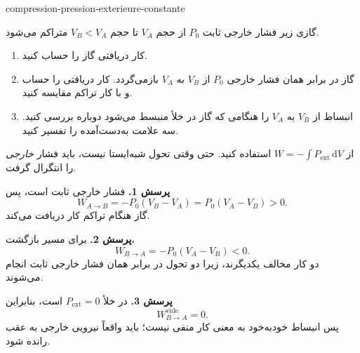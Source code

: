 \begin{exo}{compression-pression-exterieure-constante}

گازی زیر فشار خارجی ثابت $P_0$ از حجم $V_A$ تا حجم $V_B<V_A$ متراکم می‌شود.

\begin{enumerate}
\item کار دریافتی گاز را حساب کنید.
\item گاز در برابر همان فشار خارجی $P_0$ از $V_B$ به $V_A$ بازمی‌گردد. کار دریافتی را حساب و با کار تراکم مقایسه کنید.
\item انبساط از $V_B$ به $V_A$ را هنگامی که گاز در خلأ منبسط می‌شود دوباره بررسی کنید. سه علامت به‌دست‌آمده را تفسیر کنید.
\end{enumerate}

\begin{indication}
از $W=-\int P_{\mathrm{ext}}\,\mathrm{d}V$ استفاده کنید. حتی وقتی تحول شبه‌ایستا
نیست، باید فشار \emph{خارجی} را انتگرال گرفت.
\end{indication}

\begin{solution}
\textbf{پرسش 1.} فشار خارجی ثابت است، پس
\[
W_{A\to B}=-P_0(V_B-V_A)=P_0(V_A-V_B)>0.
\]
گاز هنگام تراکم کار دریافت می‌کند.

\textbf{پرسش 2.} برای مسیر بازگشت،
\[
W_{B\to A}=-P_0(V_A-V_B)<0.
\]
دو کار مخالف یکدیگرند، زیرا دو تحول در برابر همان فشار خارجی ثابت انجام می‌شوند.

\textbf{پرسش 3.} در خلأ $P_{\mathrm{ext}}=0$ است، بنابراین
\[
W_{B\to A}^{\mathrm{vide}}=0.
\]
پس انبساط خودبه‌خود به معنی کار منفی نیست؛ باید واقعاً نیرویی خارجی به عقب رانده شود.
\end{solution}
\end{exo}

